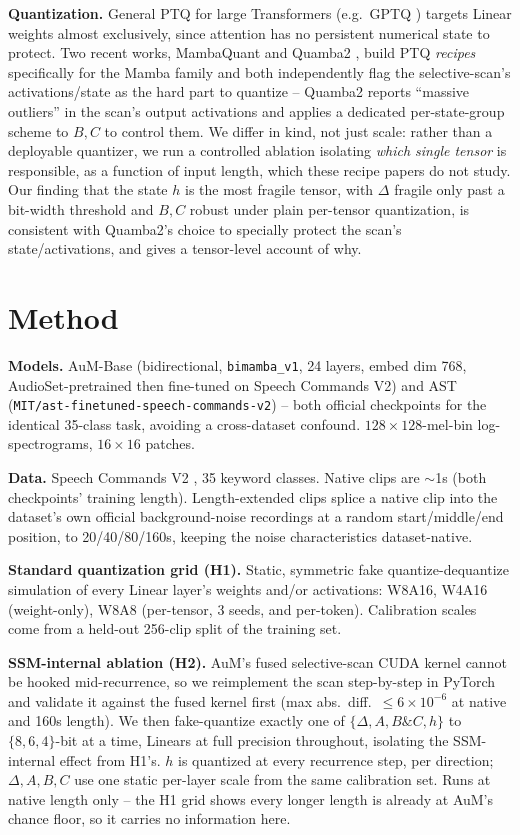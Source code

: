 \documentclass[10pt,twocolumn]{article}
\begin{document}
\textbf{Quantization.} General PTQ for large Transformers (e.g.\ GPTQ \citep{frantar2023gptq}) targets Linear weights almost exclusively, since attention has no persistent numerical state to protect. Two recent works, MambaQuant \citep{xu2025mambaquant} and Quamba2 \citep{chiang2025quamba2}, build PTQ \emph{recipes} specifically for the Mamba family and both independently flag the selective-scan's activations/state as the hard part to quantize -- Quamba2 reports ``massive outliers'' in the scan's output activations and applies a dedicated per-state-group scheme to $B,C$ to control them. We differ in kind, not just scale: rather than a deployable quantizer, we run a controlled ablation isolating \emph{which single tensor} is responsible, as a function of input length, which these recipe papers do not study. Our finding that the state $h$ is the most fragile tensor, with $\Delta$ fragile only past a bit-width threshold and $B,C$ robust under plain per-tensor quantization, is consistent with Quamba2's choice to specially protect the scan's state/activations, and gives a tensor-level account of why.

\section{Method}

\textbf{Models.} AuM-Base (bidirectional, \texttt{bimamba\_v1}, 24 layers, embed dim 768, AudioSet-pretrained then fine-tuned on Speech Commands V2) and AST (\texttt{MIT/ast-finetuned-speech-commands-v2}) -- both official checkpoints for the identical 35-class task, avoiding a cross-dataset confound. $128\times128$-mel-bin log-spectrograms, $16\times16$ patches.

\textbf{Data.} Speech Commands V2 \citep{warden2018speechcommands}, 35 keyword classes. Native clips are $\sim$1s (both checkpoints' training length). Length-extended clips splice a native clip into the dataset's own official background-noise recordings at a random start/middle/end position, to 20/40/80/160s, keeping the noise characteristics dataset-native.

\textbf{Standard quantization grid (H1).} Static, symmetric fake quantize-dequantize simulation of every Linear layer's weights and/or activations: W8A16, W4A16 (weight-only), W8A8 (per-tensor, 3 seeds, and per-token). Calibration scales come from a held-out 256-clip split of the training set.

\textbf{SSM-internal ablation (H2).} AuM's fused selective-scan CUDA kernel cannot be hooked mid-recurrence, so we reimplement the scan step-by-step in PyTorch and validate it against the fused kernel first (max abs.\ diff.\ $\le 6{\times}10^{-6}$ at native and 160s length). We then fake-quantize exactly one of $\{\Delta, A, B\&C, h\}$ to $\{8,6,4\}$-bit at a time, Linears at full precision throughout, isolating the SSM-internal effect from H1's. $h$ is quantized at every recurrence step, per direction; $\Delta,A,B,C$ use one static per-layer scale from the same calibration set. Runs at native length only -- the H1 grid shows every longer length is already at AuM's chance floor, so it carries no information here.
\end{document}
